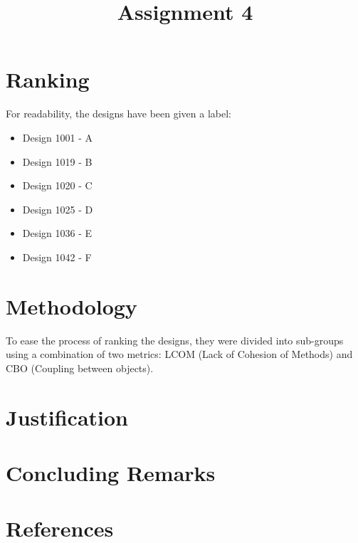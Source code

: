 \documentclass[conference]{IEEEtran}
\begin{document}
\title{Assignment 4}

\author{
}

\maketitle

\section{Ranking}
For readability, the designs have been given a label:
\begin{itemize}
	\item Design 1001 - A
	\item Design 1019 - B
	\item Design 1020 - C
	\item Design 1025 - D
	\item Design 1036 - E
	\item Design 1042 - F
\end{itemize}

\section{Methodology}
To ease the process of ranking the designs, they were divided into sub-groups using a combination of two metrics: LCOM (Lack of Cohesion of Methods) and CBO (Coupling between objects).

\section{Justification}


\section{Concluding Remarks}
 
\section*{References}
\end{document}

